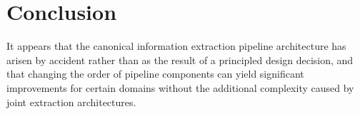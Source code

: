 \section{Conclusion}

It appears that the canonical information extraction pipeline architecture has arisen by accident rather than as the result of a principled design decision, and that changing the order of pipeline components can yield significant improvements for certain domains without the additional complexity caused by joint extraction architectures.
